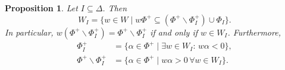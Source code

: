 \documentclass[12pt]{amsart}
\newtheorem{proposition}[theorem]{Proposition}
\theoremstyle{remark}
\begin{document}
\begin{proposition} \label{lemma:WL-stable}
Let $I\subseteq \Delta$. Then
\begin{equation}\label{eq:WI}
W_I=\{w\in W\mid w \Phi^+\subseteq (\Phi^+ \smallsetminus \Phi_I^+) \cup \Phi_I \}.
\end{equation}
In particular, $w(\Phi^+ \smallsetminus \Phi_I^+) = \Phi^+ \smallsetminus \Phi_I^+$ if and only if $w \in W_I$. Furthermore,
\begin{equation}
\begin{aligned}\label{eq:Phi-WI}
\Phi_I^+&=\{\alpha\in\Phi^+ \mid \exists w\in W_I:\, w\alpha<0\},\\
\Phi^+\smallsetminus\Phi_I^+ &=\{\alpha\in\Phi^+ \mid w\alpha>0 \, \forall w\in W_I\}.
\end{aligned} 
\end{equation}
\end{proposition}
\end{document}
